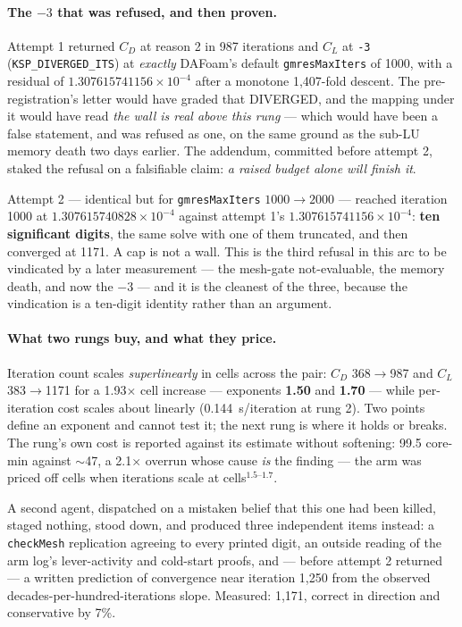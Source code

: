 \documentclass[11pt,a4paper]{article}
\begin{document}
\paragraph{The \(-3\) that was refused, and then proven.} Attempt 1 returned \(C_D\) at reason
2 in 987 iterations and \(C_L\) at \texttt{-3} (\texttt{KSP\_DIVERGED\_ITS}) at
\emph{exactly} DAFoam's default \texttt{gmresMaxIters} of 1000, with a residual of
\(1.307615741156\times10^{-4}\) after a monotone 1{,}407-fold descent. The pre-registration's
letter would have graded that DIVERGED, and the mapping under it would have read \emph{the wall
is real above this rung} --- which would have been a false statement, and was refused as one,
on the same ground as the sub-LU memory death two days earlier. The addendum, committed before
attempt 2, staked the refusal on a falsifiable claim: \emph{a raised budget alone will finish
it}.

Attempt 2 --- identical but for \texttt{gmresMaxIters} \(1000\rightarrow2000\) --- reached
iteration 1000 at \(1.307615740828\times10^{-4}\) against attempt 1's
\(1.307615741156\times10^{-4}\): \textbf{ten significant digits}, the same solve with one of
them truncated, and then converged at 1171. A cap is not a wall. This is the third refusal in
this arc to be vindicated by a later measurement --- the mesh-gate not-evaluable, the memory
death, and now the \(-3\) --- and it is the cleanest of the three, because the vindication is a
ten-digit identity rather than an argument.

\paragraph{What two rungs buy, and what they price.} Iteration count scales
\emph{superlinearly} in cells across the pair: \(C_D\) 368\(\rightarrow\)987 and \(C_L\)
383\(\rightarrow\)1171 for a 1.93\(\times\) cell increase --- exponents \textbf{1.50} and
\textbf{1.70} --- while per-iteration cost scales about linearly (0.144~s/iteration at rung 2).
Two points define an exponent and cannot test it; the next rung is where it holds or breaks.
The rung's own cost is reported against its estimate without softening: 99.5 core-min against
\(\sim\)47, a 2.1\(\times\) overrun whose cause \emph{is} the finding --- the arm was priced off
cells when iterations scale at cells\(^{1.5\text{--}1.7}\).

A second agent, dispatched on a mistaken belief that this one had been killed, staged nothing,
stood down, and produced three independent items instead: a \texttt{checkMesh} replication
agreeing to every printed digit, an outside reading of the arm log's lever-activity and
cold-start proofs, and --- before attempt 2 returned --- a written prediction of convergence
near iteration 1{,}250 from the observed decades-per-hundred-iterations slope. Measured: 1{,}171,
correct in direction and conservative by 7\%.
\end{document}
